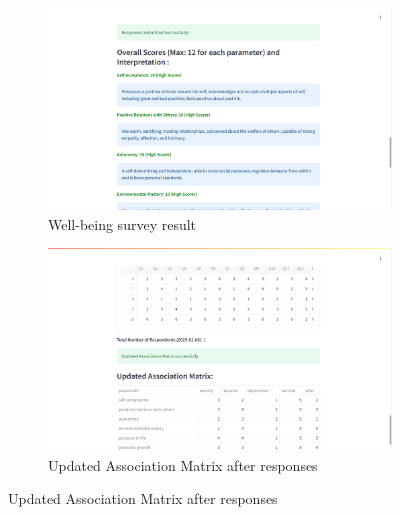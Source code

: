 \begin{figure}[h!]
    \centering
    \begin{subfigure}[b]{0.495\textwidth}
        \centering
        \includegraphics[width=\textwidth]{App Images/30 Interface.png}
        \caption*{Well-being survey result}
        \label{fig:wellbeing_questions}
    \end{subfigure}
    \hfill
    \begin{subfigure}[b]{0.495\textwidth}
        \centering
        \includegraphics[width=\textwidth]{App Images/31 Interface.png}
        \caption*{Updated Association Matrix after responses}
        \label{fig:wellbeing_result}
    \end{subfigure}
    \label{fig:wellbeing_comparison}
\end{figure}

\vspace{-2em}

